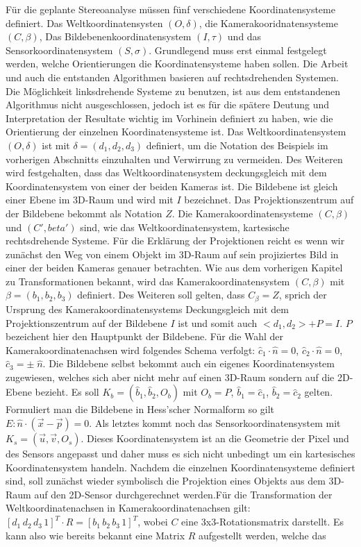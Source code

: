 Für die geplante Stereoanalyse müssen fünf verschiedene Koordinatensysteme definiert. Das Weltkoordinatensysten $(O,\delta)$, die Kamerakooridnatensysteme $(C,\beta)$, Das Bildebenenkoordinatensystem $(I,\tau)$ und das Sensorkoordinatensystem $(S,\sigma)$. Grundlegend muss erst einmal festgelegt werden, welche Orientierungen die Koordinatensysteme haben sollen. Die Arbeit und auch die entstanden Algorithmen basieren auf rechtsdrehenden Systemen. Die Möglichkeit linksdrehende Systeme zu benutzen, ist aus dem entstandenen Algorithmus nicht ausgeschlossen, jedoch ist es für die spätere Deutung und Interpretation der Resultate wichtig im Vorhinein definiert zu haben, wie die Orientierung der einzelnen Koordinatensysteme ist. Das Weltkoordinatensystem $(O,\delta)$ ist mit $\delta = (d_1,d_2,d_3)$ definiert, um die Notation des Beispiels im vorherigen Abschnitts einzuhalten und Verwirrung zu vermeiden. Des Weiteren wird festgehalten, dass das Weltkoordinatensystem deckungsgleich mit dem Koordinatensystem von einer der beiden Kameras ist. Die Bildebene ist gleich einer Ebene im 3D-Raum und wird mit \ensuremath{I} bezeichnet. Das Projektionszentrum auf der Bildebene bekommt als Notation \ensuremath{Z}. Die Kamerakoordinatensysteme $(C,\beta)$ und $(C',beta')$ sind, wie das Weltkoordinatensystem, kartesische rechtsdrehende Systeme. Für die Erklärung der Projektionen reicht es wenn wir zunächst den Weg von einem Objekt im 3D-Raum auf sein projiziertes Bild in einer der beiden Kameras genauer betrachten. Wie aus dem vorherigen Kapitel zu Transformationen bekannt, wird das Kamerakoordinatensystem $(C,\beta)$ mit $\beta = (b_1,b_2,b_3)$ definiert. Des Weiteren soll gelten, dass \ensuremath{C_\beta = Z}, sprich der Ursprung des Kamerakoordinatensystems Deckungsgleich mit dem Projektionszentrum auf der Bildebene $I$ ist und somit auch \ensuremath{ <d_1,d_2> + P = I}. \ensuremath{P} bezeichent hier den Hauptpunkt der Bildebene. Für die Wahl der Kamerakoordinatenachsen wird folgendes Schema verfolgt: \ensuremath{\hat{c}_1 \cdot \hat{n} = 0}, \ensuremath{\hat{c}_2 \cdot \hat{n} = 0}, \ensuremath{\hat{c}_3  = \pm\;\hat{n}}.  Die Bildebene selbst bekommt auch ein eigenes Koordinatensystem zugewiesen, welches sich aber nicht mehr auf einen 3D-Raum sondern auf die 2D-Ebene bezieht. Es soll \ensuremath{K_b = (\hat{b}_1,\hat{b}_2,O_b)} mit \ensuremath{O_b = P}, \ensuremath{\hat{b}_1 = \hat{c}_1}, \ensuremath{\hat{b}_2 = \hat{c}_2} gelten.  Formuliert man die Bildebene in Hess'scher Normalform so gilt \ensuremath{E: \hat{n} \cdot (\vec{x} - \vec{p}) = 0}. Als letztes kommt noch das Sensorkoordinatensystem mit  \ensuremath{K_s = (\vec{u}, \vec{v}, O_s)}. Dieses Koordinatensystem ist an die Geometrie der Pixel und des Sensors angepasst und daher muss es sich nicht unbedingt um ein kartesisches Koordinatensystem handeln. Nachdem die einzelnen Koordinatensysteme definiert sind, soll zunächst wieder symbolisch die Projektion eines Objekts aus dem 3D-Raum auf den 2D-Sensor durchgerechnet werden.Für die Transformation der Weltkoordinatenachsen in Kamerakoordinatenachsen gilt: \ensuremath{[d_1\,d_2\,d_3\,1]^T \cdot R = [b_1\,b_2\,b_3\,1]^T}, wobei \ensuremath{C} eine 3x3-Rotationsmatrix darstellt. Es kann also wie bereits bekannt eine Matrix \ensuremath{R} aufgestellt werden, welche das 